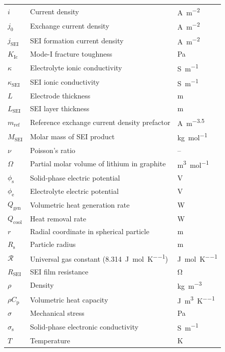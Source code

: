 \begin{longtable}{p{3.5cm} p{9cm} p{2cm}}
$i$ & Current density & \si{\ampere\per\meter\squared} \\
$j_0$ & Exchange current density & \si{\ampere\per\meter\squared} \\
$j_\text{SEI}$ & SEI formation current density & \si{\ampere\per\meter\squared} \\
$K_\text{Ic}$ & Mode-I fracture toughness & \si{\pascal\sqrt{\meter}} \\
$\kappa$ & Electrolyte ionic conductivity & \si{\siemens\per\meter} \\
$\kappa_\text{SEI}$ & SEI ionic conductivity & \si{\siemens\per\meter} \\
$L$ & Electrode thickness & \si{\meter} \\
$L_\text{SEI}$ & SEI layer thickness & \si{\meter} \\
$m_\text{ref}$ & Reference exchange current density prefactor & \si{\ampere\per\meter^{3.5}} \\
$M_\text{SEI}$ & Molar mass of SEI product & \si{\kilogram\per\mol} \\
$\nu$ & Poisson's ratio & -- \\
$\Omega$ & Partial molar volume of lithium in graphite & \si{\meter\cubed\per\mol} \\
$\phi_\text{s}$ & Solid-phase electric potential & \si{\volt} \\
$\phi_\text{e}$ & Electrolyte electric potential & \si{\volt} \\
$Q_\text{gen}$ & Volumetric heat generation rate & \si{\watt} \\
$Q_\text{cool}$ & Heat removal rate & \si{\watt} \\
$r$ & Radial coordinate in spherical particle & \si{\meter} \\
$R_\text{s}$ & Particle radius & \si{\meter} \\
$\mathcal{R}$ & Universal gas constant (\SI{8.314}{\joule\per\mol\per\kelvin}) & \si{\joule\per\mol\per\kelvin} \\
$R_\text{SEI}$ & SEI film resistance & \si{\ohm} \\
$\rho$ & Density & \si{\kilogram\per\meter\cubed} \\
$\rho C_\text{p}$ & Volumetric heat capacity & \si{\joule\per\meter\cubed\per\kelvin} \\
$\sigma$ & Mechanical stress & \si{\pascal} \\
$\sigma_\text{s}$ & Solid-phase electronic conductivity & \si{\siemens\per\meter} \\
$T$ & Temperature & \si{\kelvin} \\

\end{longtable}
